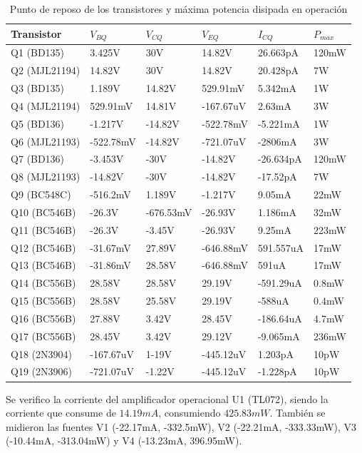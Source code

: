 \begin{table}[H]
\begin{center}
\begin{tabular}{llllll}
\hline\hline
Transistor & $V_{BQ}$ & $V_{CQ}$ & $V_{EQ}$ & $I_{CQ}$ & $P_{max}$\\
\hline \hline
Q1 (BD135) & 3.425V & 30V & 14.82V & 26.663pA & 120mW \\ 
Q2 (MJL21194) & 14.82V & 30V & 14.82V & 20.428pA & 7W \\ 
Q3 (BD135) & 1.189V & 14.82V & 529.91mV & 5.342mA & 1W \\ 
Q4 (MJL21194) & 529.91mV & 14.81V & -167.67uV & 2.63mA & 3W  \\ 
Q5 (BD136) & -1.217V & -14.82V & -522.78mV & -5.221mA & 1W \\ 
Q6 (MJL21193) & -522.78mV & -14.82V & -721.07uV & -2806mA & 3W \\ 
Q7 (BD136) & -3.453V & -30V & -14.82V & -26.634pA & 120mW \\ 
Q8 (MJL21193) & -14.82V & -30V & -14.82V & -17.52pA & 7W \\ 
Q9 (BC548C) & -516.2mV & 1.189V & -1.217V & 9.05mA & 22mW \\ 
Q10 (BC546B) & -26.3V & -676.53mV & -26.93V & 1.186mA & 32mW \\ 
Q11 (BC546B) & -26.3V & -3.45V & -26.93V & 9.25mA &223mW \\ 
Q12 (BC546B) & -31.67mV & 27.89V & -646.88mV & 591.557uA & 17mW \\ 
Q13 (BC546B) & -31.86mV & 28.58V & -646.88mV & 591uA & 17mW \\
Q14 (BC556B) & 28.58V & 28.58V & 29.19V & -591.29uA & 0.8mW \\ 
Q15 (BC556B) & 28.58V & 25.58V & 29.19V & -588uA & 0.4mW \\ 
Q16 (BC556B) & 27.88V & 3.42V & 28.45V & -186.64uA & 4.7mW \\ 
Q17 (BC556B) & 28.45V & 3.42V & 29.12V & -9.065mA & 236mW \\ 
Q18 (2N3904) & -167.67uV & 1-19V & -445.12uV & 1.203pA & 10pW \\ 
Q19 (2N3906) & -721.07uV & -1.22V & -445.12uV & -1.228pA & 10pW \\ \hline\hline
\end{tabular}
\caption{Punto de reposo de los transistores y máxima potencia disipada en operación}
\label{tabla_reposo_calculo}
\end{center}
\end{table}

\par Se verifico la corriente del amplificador operacional U1 (TL072), siendo la corriente que consume de $14.19mA$, consumiendo $425.83mW$. También se midieron las fuentes V1 (-22.17mA, -332.5mW), V2 (-22.21mA, -333.33mW), V3 (-10.44mA, -313.04mW) y V4 (-13.23mA, 396.95mW).

